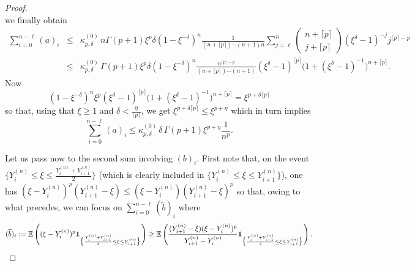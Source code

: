 \begin{proof}
\[\]
we finally obtain
 \begin{eqnarray*}
\sum_{i=0}^{n-\ell} (a)_i& \le& \kappa^{(0)}_{p,\delta}\,  n \Gamma(p+1)\xi^p
\delta  (1-\xi^{-\delta})^n \frac{1}{(n+\lceil p\rceil )\cdots
(n+1)n}\sum_{j=\ell}^{n} \left(\begin{smallmatrix} n+\lceil p\rceil \\ j+\lceil p\rceil  \end{smallmatrix}\right)(\xi^{\delta}-1)^{-j}j^{\lceil p\rceil -p}\\
&\le&  \kappa^{(0)}_{p,\delta} \, \Gamma(p+1)\xi^p \delta  (1-\xi^{-\delta})^n \frac{n^{\lceil p\rceil -p}}{(n+\lceil p\rceil )\cdots (n+1)}(\xi^{\delta}-1)^{\lceil p\rceil }\Big(1+(\xi^{\delta}-1)^{-1}\Big)^{n+\lceil p\rceil }.  
\end{eqnarray*}
Now 
\[
 (1-\xi^{-\delta})^n \xi^p(\xi^{\delta}-1)^{\lceil p\rceil} \Big(1+(\xi^{\delta}-1)^{-1}\Big)^{n+\lceil p\rceil }= \xi^{p + \delta\lceil p\rceil}
\]
%
so that, using that $\xi\ge 1$ and $ \delta <\frac{\eta}{\lceil p\rceil}$,  we get $\xi^{p + \delta\lceil p\rceil}
\le  \xi^{p+\eta}$ which in turn implies   
\[
\sum_{i=0}^{n-\ell} (a)_i  \le  \kappa^{(0)}_{p,\delta}  \, \delta\,   \Gamma(p+1) \xi^{p+\eta} \frac{1}{n^p}.
\]

%
Let us pass now to the second sum involving $(b)_i$.  First note that, on the event $\displaystyle\Big \{Y^{(n)}_i \le \xi\le \frac{Y^{(n)}_i+Y^{(n)}_{i+1}}{2}\Big\}$ (which is clearly included in $\big\{Y^{(n)}_i \le \xi\le Y^{(n)}_{i+1}\big\}$), one has $(\xi-Y^{(n)}_i)^p(Y^{(n)}_{i+1}-\xi)\le (\xi-Y^{(n)}_i)(Y^{(n)}_{i+1}-\xi)^p$
 so that, owing to what precedes, we can focus on $\displaystyle \sum_{i=0}^{n-\ell} (\widetilde b)_i$ where 
 \[
  (\widetilde b)_i:=\mathbb{E} \left((\xi-Y^{(n)}_i)^p\mbox{\bf 1}_{\big\{  \frac{Y^{(n)}_i+Y^{(n)}_{i+1}}{2}\le \xi\le Y^{(n)}_{i+1}\big\}}\right)\ge \mathbb{E} \left(\frac{(Y^{(n)}_{i+1}-\xi)(\xi-Y^{(n)}_i)^p}{Y^{(n)}_{i+1}-Y^{(n)}_i}\mbox{\bf 1}_{\big\{  \frac{Y^{(n)}_i+Y^{(n)}_{i+1}}{2}\le \xi\le Y^{(n)}_{i+1}\big\}}\right).
 \]
 

\end{proof}
